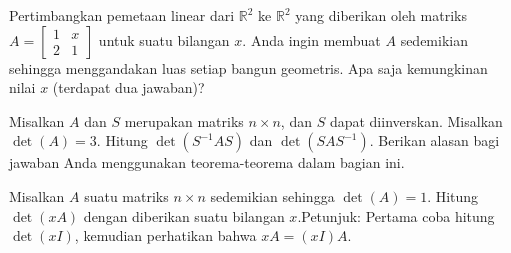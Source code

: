 \begin{exercise}
Pertimbangkan pemetaan linear dari ${\mathbb R}^2$ ke ${\mathbb R}^2$
yang diberikan oleh matriks
$A = \left[ \begin{smallmatrix}
1 & x \\
2 & 1
\end{smallmatrix} \right]$
untuk suatu bilangan $x$. Anda ingin membuat $A$ sedemikian sehingga menggandakan luas
setiap bangun geometris. Apa saja kemungkinan nilai $x$ (terdapat dua
jawaban)?
\end{exercise}

\begin{exercise}
Misalkan $A$ dan $S$ merupakan matriks $n \times n$, dan $S$ dapat diinverskan.
Misalkan $\det(A) = 3$. Hitung $\det(S^{-1}AS)$ dan
$\det(SAS^{-1})$. Berikan alasan bagi jawaban Anda menggunakan teorema-teorema dalam bagian ini.
\end{exercise}

\begin{exercise}
Misalkan $A$ suatu matriks $n \times n$ sedemikian sehingga $\det(A)=1$.
Hitung $\det(x A)$ dengan diberikan suatu bilangan $x$.\linebreak[2]
Petunjuk: Pertama coba hitung
$\det(xI)$, kemudian perhatikan bahwa $xA = (xI)A$.
\end{exercise}

\setcounter{exercise}{100}

